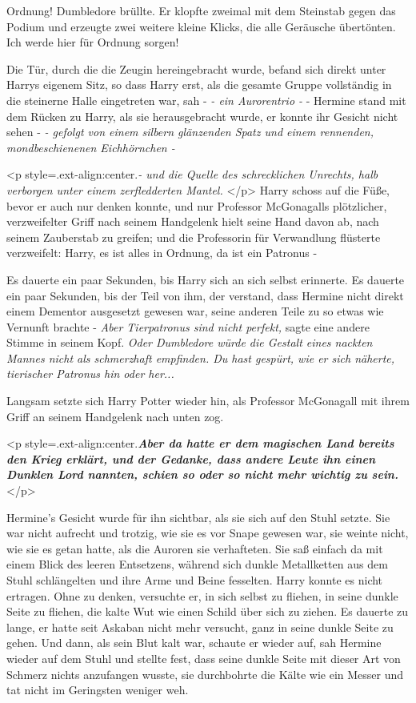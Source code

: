\glqq Ordnung!\grqq{} Dumbledore brüllte. Er klopfte zweimal mit dem Steinstab
gegen das Podium und erzeugte zwei weitere kleine Klicks, die alle Geräusche
übertönten. \glqq Ich werde hier für Ordnung sorgen!\grqq{}

Die Tür, durch die die Zeugin hereingebracht wurde, befand sich direkt unter
Harrys eigenem Sitz, so dass Harry erst, als die gesamte Gruppe vollständig in
die steinerne Halle eingetreten war, sah - \emph{- ein Aurorentrio -} - Hermine
stand mit dem Rücken zu Harry, als sie herausgebracht wurde, er konnte ihr
Gesicht nicht sehen - \emph{- gefolgt von einem silbern glänzenden Spatz und
einem rennenden, mondbeschienenen Eichhörnchen -}

<p style=\grqq{}.ext-align:center\grqq{}.\emph{- und die Quelle des
schrecklichen Unrechts, halb verborgen unter einem zerfledderten Mantel. } </p>
Harry schoss auf die Füße, bevor er auch nur denken konnte, und nur Professor
McGonagalls plötzlicher, verzweifelter Griff nach seinem Handgelenk hielt seine
Hand davon ab, nach seinem Zauberstab zu greifen; und die Professorin für
Verwandlung flüsterte verzweifelt: \glqq Harry, es ist alles in Ordnung, da ist
ein Patronus -\grqq{}

Es dauerte ein paar Sekunden, bis Harry sich an sich selbst erinnerte. Es
dauerte ein paar Sekunden, bis der Teil von ihm, der verstand, dass Hermine
nicht direkt einem Dementor ausgesetzt gewesen war, seine anderen Teile zu so
etwas wie Vernunft brachte - \emph{Aber Tierpatronus sind nicht perfekt,} sagte
eine andere Stimme in seinem Kopf. \emph{Oder Dumbledore würde die Gestalt eines
nackten Mannes nicht als schmerzhaft empfinden. Du hast gespürt, wie er sich
näherte, tierischer Patronus hin oder her...}

Langsam setzte sich Harry Potter wieder hin, als Professor McGonagall mit ihrem
Griff an seinem Handgelenk nach unten zog.

<p style=\grqq{}.ext-align:center\grqq{}.\textbf{\emph{Aber da hatte er dem
magischen Land bereits den Krieg erklärt, und der Gedanke, dass andere Leute ihn
einen Dunklen Lord nannten, schien so oder so nicht mehr wichtig zu sein. }}</p>

Hermine's Gesicht wurde für ihn sichtbar, als sie sich auf den Stuhl setzte. Sie
war nicht aufrecht und trotzig, wie sie es vor Snape gewesen war, sie weinte
nicht, wie sie es getan hatte, als die Auroren sie verhafteten. Sie saß einfach
da mit einem Blick des leeren Entsetzens, während sich dunkle Metallketten aus
dem Stuhl schlängelten und ihre Arme und Beine fesselten. Harry konnte es nicht
ertragen. Ohne zu denken, versuchte er, in sich selbst zu fliehen, in seine
dunkle Seite zu fliehen, die kalte Wut wie einen Schild über sich zu ziehen. Es
dauerte zu lange, er hatte seit Askaban nicht mehr versucht, ganz in seine
dunkle Seite zu gehen. Und dann, als sein Blut kalt war, schaute er wieder auf,
sah Hermine wieder auf dem Stuhl und stellte fest, dass seine dunkle Seite mit
dieser Art von Schmerz nichts anzufangen wusste, sie durchbohrte die Kälte wie
ein Messer und tat nicht im Geringsten weniger weh.

